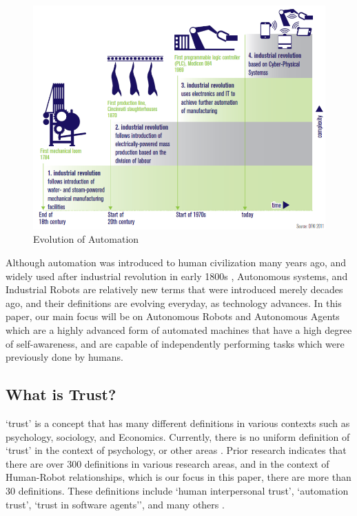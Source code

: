 \documentclass[runningheads,a4paper]{llncs}
\begin{document}
\begin{figure}
	\centering
		\includegraphics[width=\textwidth]{Figures/EvolutionOfAutomation.png}
	\caption{Evolution of Automation \cite{CyberSecurityInIndustry}}
	\label{Trust_Function}
\end{figure}
Although automation was introduced to human civilization many years ago, and widely used after industrial revolution in early 1800s \cite{IndustrialRevolution}, Autonomous systems, and Industrial Robots are relatively new terms that were introduced merely decades ago, and their definitions are evolving everyday, as technology advances. In this paper, our main focus will be on Autonomous Robots and Autonomous Agents which are a highly advanced form of automated machines that have a high degree of self-awareness, and are capable of independently performing tasks which were previously done by humans.

\subsection{What is Trust?}
`trust' is a concept that has many different definitions in various contexts such as psychology, sociology, and Economics. Currently, there is no uniform definition of `trust' in the context of psychology, or other areas \cite{adams2003trust}. Prior research indicates that there are over 300 definitions in various research areas, and in the context of Human-Robot relationships, which is our focus in this paper, there are more than 30 definitions. These definitions include `human interpersonal trust', `automation trust', `trust in software agents'', and many others \cite{schaefer2013perception}. 
\end{document}
